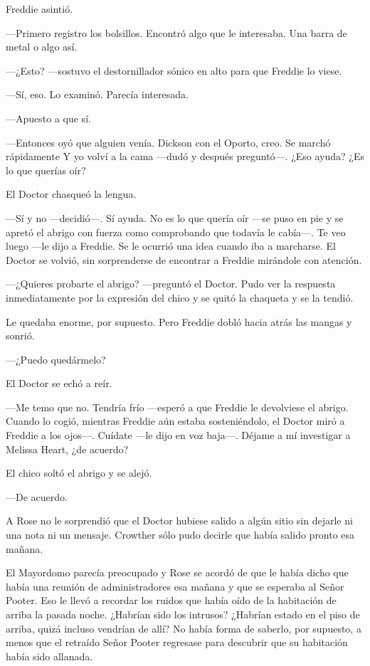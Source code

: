 {Freddie asintió.}

{---Primero registro los bolsillos. Encontró algo que le interesaba. Una
barra de metal o algo así.}

{---¿Esto? ---sostuvo el destornillador sónico en alto para que Freddie
lo viese.}

{---Sí, eso. Lo examinó. Parecía interesada.}

{---Apuesto a que sí.}

{---Entonces oyó que alguien venía. Dickson con el Oporto, creo. Se
	marchó rápidamente Y yo volví a la cama ---dudó y después preguntó---.
¿Eso ayuda? ¿Es lo que querías oír?}

{El Doctor chasqueó la lengua.}

{---Sí y no ---decidió---. Sí ayuda. No es lo que quería oír ---se puso
	en pie y se apretó el abrigo con fuerza como comprobando que todavía le
	cabía---. Te veo luego ---le dijo a Freddie. Se le ocurrió una idea
	cuando iba a marcharse. El Doctor se volvió, sin sorprenderse de
encontrar a Freddie mirándole con atención.}

{---¿Quieres probarte el abrigo? ---preguntó el Doctor. Pudo ver la
	respuesta inmediatamente por la expresión del chico y se quitó la
chaqueta y se la tendió.}

{Le quedaba enorme, por supuesto. Pero Freddie dobló hacia atrás las
mangas y sonrió.}

{---¿Puedo quedármelo?}

{El Doctor se echó a reír.}

{---Me temo que no. Tendría frío ---esperó a que Freddie le devolviese
	el abrigo. Cuando lo cogió, mientras Freddie aún estaba sosteniéndolo,
	el Doctor miró a Freddie a los ojos---. Cuídate ---le dijo en voz
baja---. Déjame a mí investigar a Melissa Heart, ¿de acuerdo?}

{El chico soltó el abrigo y se alejó.}

{---De acuerdo.}

\mbox{}

{A Rose no le sorprendió que el Doctor hubiese salido a algún sitio sin
	dejarle ni una nota ni un mensaje. Crowther sólo pudo decirle que había
salido pronto esa mañana.}

{El Mayordomo parecía preocupado y Rose se acordó de que le había dicho
	que había una reunión de administradores esa mañana y que se esperaba al
	Señor Pooter. Eso le llevó a recordar los ruidos que había oído de la
	habitación de arriba la pasada noche. ¿Habrían sido los intrusos?
	¿Habrían estado en el piso de arriba, quizá incluso vendrían de allí?
	No había forma de saberlo, por supuesto, a menos que el retraído Señor
Pooter regresase para descubrir que su habitación había sido allanada.}

